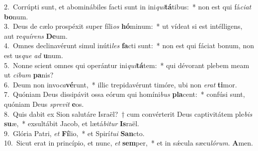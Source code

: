 {2.~}Corrúpti sunt, et abominábiles facti sunt in ini\textit{qui}\textbf{tá}tibus:~* non est qui fá\textit{ci}\textit{at} \textbf{bo}num.\\
{3.~}Deus de cælo prospéxit super fíli\textit{os} \textbf{hó}minum:~* ut vídeat si est intélligens, aut re\textit{quí}\textit{rens} \textbf{De}um.\\
{4.~}Omnes declinavérunt simul inúti\textit{les} \textbf{fa}cti sunt:~* non est qui fáciat bonum, non est us\textit{que} \textit{ad} \textbf{u}num.\\
{5.~}Nonne scient omnes qui operántur ini\textit{qui}\textbf{tá}tem:~* qui dévorant plebem meam ut \textit{ci}\textit{bum} \textbf{pa}nis?\\
{6.~}Deum non invo\textit{ca}\textbf{vé}runt,~* illic trepidavérunt timóre, ubi non \textit{e}\textit{rat} \textbf{ti}mor.\\
{7.~}Quóniam Deus dissipávit ossa eórum qui homíni\textit{bus} \textbf{pla}cent:~* confúsi sunt, quóniam Deus \textit{spre}\textit{vit} \textbf{e}os.\\
{8.~}Quis dabit ex Sion salutáre Israël?~† cum convérterit Deus captivitátem ple\textit{bis} \textbf{su}æ,~* exsultábit Jacob, et lætá\textit{bi}\textit{tur} \textbf{Is}raël.\\
{9.~}Glória Patri, \textit{et} \textbf{Fí}lio,~* et Spirí\textit{tu}\textit{i} \textbf{San}cto.\\
{10.~}Sicut erat in princípio, et nunc, \textit{et} \textbf{sem}per,~* et in sǽcula sæcu\textit{ló}\textit{rum}. \textbf{A}men.\\
